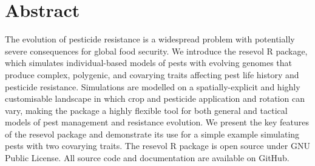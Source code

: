 \documentclass[10pt,letterpaper]{article}
\begin{document}
\section*{Abstract}
The evolution of pesticide resistance is a widespread problem with potentially severe consequences for global food security.
We introduce the resevol R package, which simulates individual-based models of pests with evolving genomes that produce complex, polygenic, and covarying traits affecting pest life history and pesticide resistance.
Simulations are modelled on a spatially-explicit and highly customisable landscape in which crop and pesticide application and rotation can vary, making the package a highly flexible tool for both general and tactical models of pest management and resistance evolution.
We present the key features of the resevol package and demonstrate its use for a simple example simulating pests with two covarying traits.
The resevol R package is open source under GNU Public License. All source code and documentation are available on GitHub.



\linenumbers

\end{document}
